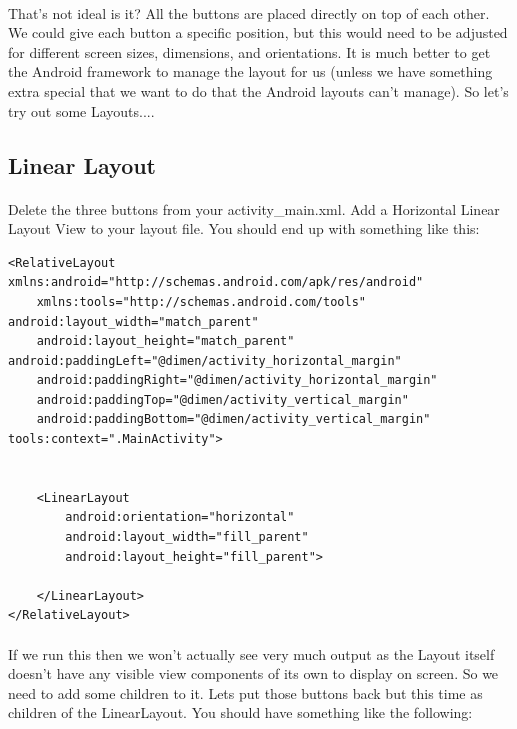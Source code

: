 \documentclass[12pt, a4paper, twoside]{book}
\begin{document}
\paragraph{} That's not ideal is it? All the buttons are placed directly on top of each other. We could give each button a specific position, but this would need to be adjusted for different screen sizes, dimensions, and orientations. It is much better to get the Android framework to manage the layout for us (unless we have something extra special that we want to do that the Android layouts can't manage). So let's try out some Layouts....

\subsection{Linear Layout}
\paragraph{} Delete the three buttons from your activity\_main.xml. Add a Horizontal Linear Layout View to your layout file. You should end up with something like this:

\begin{lstlisting}
<RelativeLayout xmlns:android="http://schemas.android.com/apk/res/android"
    xmlns:tools="http://schemas.android.com/tools" android:layout_width="match_parent"
    android:layout_height="match_parent" android:paddingLeft="@dimen/activity_horizontal_margin"
    android:paddingRight="@dimen/activity_horizontal_margin"
    android:paddingTop="@dimen/activity_vertical_margin"
    android:paddingBottom="@dimen/activity_vertical_margin" tools:context=".MainActivity">


    <LinearLayout
        android:orientation="horizontal"
        android:layout_width="fill_parent"
        android:layout_height="fill_parent">
        
    </LinearLayout>
</RelativeLayout>
\end{lstlisting}
\paragraph{} If we run this then we won't actually see very much output as the Layout itself doesn't have any visible view components of its own to display on screen. So we need to add some children to it. Lets put those buttons back but this time as children of the LinearLayout. You should have something like the following:
\end{document}
